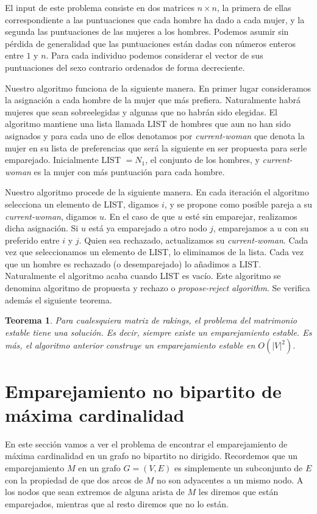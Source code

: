 \documentclass[twoside,12pt]{article}
\newtheorem{theorem}{Teorema}[section]
\begin{document}
El input de este problema consiste en dos matrices $n\times n$, la primera de ellas correspondiente a las puntuaciones que cada hombre ha dado a cada mujer, y la segunda las puntuaciones de las mujeres a los hombres. Podemos asumir sin pérdida de generalidad que las puntuaciones están dadas con números enteros entre $1$ y $n$. Para cada individuo podemos considerar el vector de sus puntuaciones del sexo contrario ordenados de forma decreciente. 

Nuestro algoritmo funciona de la siguiente manera. En primer lugar consideramos la asignación a cada hombre de la mujer que más prefiera. Naturalmente habrá mujeres que sean sobreelegidas y algunas que no habrán sido elegidas. El algoritmo mantiene una lista llamada LIST de hombres que aun no han sido asignados y para cada uno de ellos denotamos por \textit{current-woman} que denota la mujer en su lista de preferencias que será la siguiente en ser propuesta para serle emparejado. Inicialmente LIST $=N_1$, el conjunto de los hombres, y \textit{current-woman} es la mujer con más puntuación para cada hombre. 

Nuestro algoritmo procede de la siguiente manera. En cada iteración el algoritmo selecciona un elemento de LIST, digamos $i$, y se propone como posible pareja a su \textit{current-woman}, digamos $u$. En el caso de que $u$ esté sin emparejar, realizamos dicha asignación. Si $u$ está ya emparejado a otro nodo $j$, emparejamos a $u$ con su preferido entre $i$ y $j$. Quien sea rechazado, actualizamos su \textit{current-woman}. Cada vez que seleccionamos un elemento de LIST, lo eliminamos de la lista. Cada vez que un hombre es rechazado (o desemparejado) lo añadimos a LIST. Naturalmente el algoritmo acaba cuando LIST es vacío. Este algoritmo se denomina algoritmo de propuesta y rechazo o \textit{propose-reject algorithm}. Se verifica además el siguiente teorema.
\begin{theorem}
Para cualesquiera matriz de rakings, el problema del matrimonio estable tiene una solución. Es decir, siempre existe un emparejamiento estable. Es más, el algoritmo anterior construye un emparejamiento estable en $O(|V|^2)$.
\end{theorem}
\section{Emparejamiento no bipartito de máxima cardinalidad}
En este sección vamos a ver el problema de encontrar el emparejamiento de máxima cardinalidad en un grafo no bipartito no dirigido. Recordemos que un emparejamiento $M$ en un grafo $G=(V,E)$ es simplemente un subconjunto de $E$ con la propiedad de que dos arcos de $M$ no son adyacentes a un mismo nodo. A los nodos que sean extremos de alguna arista de $M$ les diremos que están emparejados, mientras que al resto diremos que no lo están. 
\end{document}
